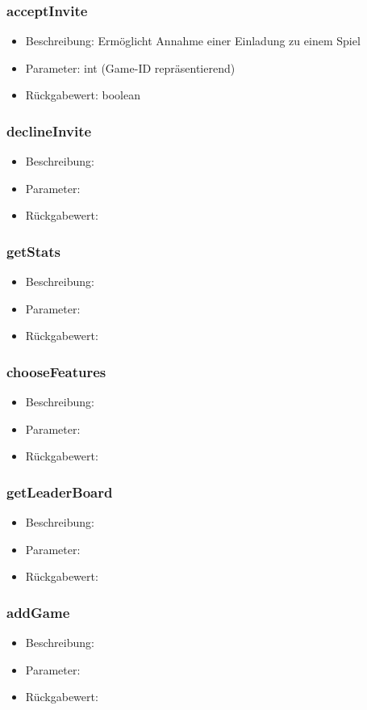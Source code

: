 \documentclass[a4paper]{scrreprt}
\begin{document}
		\subsubsection{acceptInvite}
		\begin{itemize}
			\item Beschreibung: Ermöglicht Annahme einer Einladung zu einem Spiel
			\item Parameter: int (Game-ID repräsentierend)
			\item Rückgabewert: boolean
		\end{itemize}
		\subsubsection{declineInvite}
		\begin{itemize}
			\item Beschreibung:
			\item Parameter:
			\item Rückgabewert:
		\end{itemize}
		\subsubsection{getStats}
		\begin{itemize}
			\item Beschreibung:
			\item Parameter:
			\item Rückgabewert:
		\end{itemize}
		\subsubsection{chooseFeatures}
		\begin{itemize}
			\item Beschreibung:
			\item Parameter:
			\item Rückgabewert:
		\end{itemize}
		\subsubsection{getLeaderBoard}
		\begin{itemize}
			\item Beschreibung:
			\item Parameter:
			\item Rückgabewert:
		\end{itemize}
		\subsubsection{addGame}
		\begin{itemize}
			\item Beschreibung:
			\item Parameter:
			\item Rückgabewert:
		\end{itemize}
\end{document}
